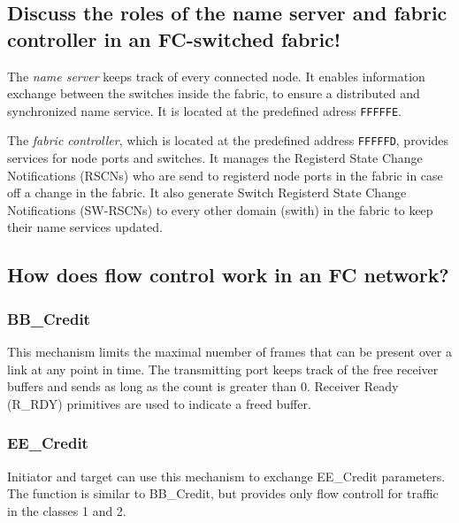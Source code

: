 \subsection{Discuss the roles of the name server and fabric controller in an FC-switched fabric!} %
\label{sub:discuss_the_roles_of_the_name_server_and_fabric_controller_in_an_fc_switched_fabric}
	The \emph{name server} keeps track of every connected node.
	It enables information exchange between the switches inside the fabric,
	to ensure a distributed and synchronized name service.
	It is located at the predefined adress \texttt{FFFFFE}.

	The \emph{fabric controller},
	which is located at the predefined address \texttt{FFFFFD},
	provides services for node ports and switches.
	It manages the Registerd State Change Notifications (RSCNs)
	who are send to registerd node ports in the fabric
	in case off a change in the fabric.
	It also generate Switch Registerd State Change Notifications (SW-RSCNs)
	to every other domain (swith) in the fabric to
	keep their name services updated.

\subsection{How does flow control work in an FC network?} %
\label{sub:how_does_flow_control_work_in_an_fc_network}

	\subsubsection{BB\_Credit} %
	\label{ssub:bb_credit}
		This mechanism limits the maximal nuember of frames
		that can be present over a link at any point in time.
		The transmitting port keeps track of the free receiver buffers
		and sends as long as the count is greater than 0.
		Receiver Ready (R\_RDY) primitives are used to indicate a freed buffer.

	\subsubsection{EE\_Credit} %
	\label{ssub:ee_credit}
		Initiator and target can use this mechanism to exchange EE\_Credit parameters.
		The function is similar to BB\_Credit,
		but provides only flow controll for traffic in the classes 1 and 2.

